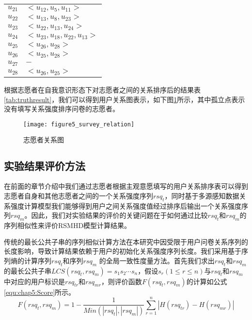 \begin{table}[htb]
\begin{minipage}[t]{0.8\linewidth}
\begin{tabular*}{\linewidth}{cp{10cm}}
      \mbox{$u_{21}$} & \mbox{$ <u_{12},u_{5},u_{11}>$}\\
      \mbox{$u_{22} $}& \mbox{$ <u_{13},u_{8},u_{23}>$}\\
      \mbox{$u_{23}$} & \mbox{$ <u_{22},u_{13},u_{24}>$}\\
      \mbox{$u_{24}$} &\mbox{$ <u_{23},u_{18},u_{22},u_{13}>$}\\
      \mbox{$u_{25} $}&\mbox{$ <u_{26},u_{28}>$}\\
      \mbox{$u_{26} $}&\mbox{$ <u_{25},u_{28}>$}\\
      \mbox{$u_{27} $}&\mbox{$ -$}\\
      \mbox{$u_{28}$} &\mbox{$ <u_{26},u_{25}>$}\\
      \bottomrule[1.5pt]
    \end{tabular*}
  \end{minipage}
\end{table}
\par 根据志愿者在自我意识形态下对志愿者之间的关系排序后的结果表\ref{tab:truthresult}，我们可以得到用户关系图表示，如下图\ref{fig:survey_relation}所示，其中孤立点表示没有填写关系强度排序问卷的志愿者。
\begin{figure}[htb]
\centering
\texttt{[image: figure5\_survey\_relation]}
\caption{志愿者关系图}
\label{fig:survey_relation}
\end{figure}
\subsection{实验结果评价方法}
在前面的章节介绍中我们通过志愿者根据主观意愿填写的用户关系排序表可以得到志愿者自身和其他志愿者之间的一个关系强度序列$rsq_{t}$，同时基于多源感知数据关系强度计算模型我们能够得到用户之间关系强度值经过排序后输出一个关系强度序列$rsq_{m}$。因此，我们对实验结果的评价的关键问题在于如何通过比较$rsq_{t}$和$rsq_{m}$的序列相似性来评价RSMHD模型计算结果。
\par 传统的最长公共子串的序列相似计算方法在本研究中因受限于用户问卷关系序列的长度影响，导致计算结果依赖于用户的初始化关系强度序列长度。我们采用基于序列熵的计算序列$rsq_{t}$和序列$rsq_{m}$ 的全局一致性度量方法。首先我们求出$rsq_{t}$和$rsq_{m}$的最长公共子串$LCS(rsq_{t},rsq_{m})=s_{1}s_{2}\cdots s_{n}$，假设$s_{r}(1\leqslant r \leqslant n)$与$rsq_{t}$和$rsq_{m}$中对应的用户标识是$rsq_{tr}$和$rsq_{mr}$，则评价函数$F(rsq_{t},rsq_{m})$的计算如公式\ref{equ:chap5:Score}所示。
\begin{equation}
\label{equ:chap5:Score}
F(rsq_{t},rsq_{m})=1-\frac{1}{Min(  \left |rsq_{t}  \right |, \left |rsq_{m}  \right | ) }\sum_{r=1}^{n}\left | H(rsq_{tr})-H(rsq_{mr}) \right |
\end{equation}

